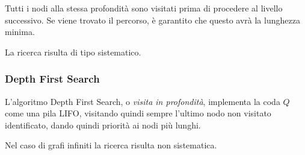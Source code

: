 \documentclass[\main/main.tex]{subfiles}
\begin{document}
Tutti i nodi alla stessa profondità sono visitati prima di procedere al livello successivo. Se viene trovato il percorso, è garantito che questo avrà la lunghezza minima.

La ricerca risulta di tipo sistematico.

\subsubsection{Depth First Search}
L'algoritmo Depth First Search, o \textit{visita in profondità}, implementa la coda $Q$ come una pila LIFO, visitando quindi sempre l'ultimo nodo non visitato identificato, dando quindi priorità ai nodi più lunghi.

Nel caso di grafi infiniti la ricerca risulta non sistematica.
\end{document}
